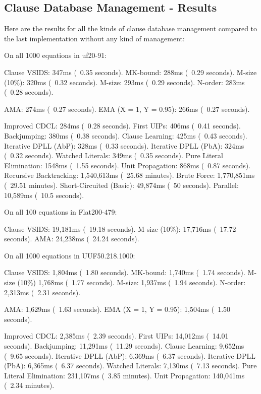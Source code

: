 \documentclass[../main.tex]{subfiles}
\begin{document}
\subsection{Clause Database Management - Results}

Here are the results for all the kinds of clause database management compared to 
the last implementation without any kind of management:

\begin{FVerbatim}
On all 1000 equations in uf20-91:

Clause VSIDS:               347ms (~0.35 seconds).
MK-bound:                   288ms (~0.29 seconds).
M-size (10\%):              320ms (~0.32 seconds).
M-size:                     293ms (~0.29 seconds).
N-order:                    283ms (~0.28 seconds).

AMA:                        274ms (~0.27 seconds).
EMA (X = 1, Y = 0.95):      266ms (~0.27 seconds).

Improved CDCL:              284ms (~0.28 seconds).
First UIPs:                 406ms (~0.41 seconds).
Backjumping:                380ms (~0.38 seconds).
Clause Learning:            425ms (~0.43 seconds).
Iterative DPLL (AbP):       328ms (~0.33 seconds).
Iterative DPLL (PbA):       324ms (~0.32 seconds).
Watched Literals:           349ms (~0.35 seconds).
Pure Literal Elimination:   1548ms (~1.55 seconds).
Unit Propagation:           868ms (~0.87 seconds).
Recursive Backtracking:     1,540,613ms (~25.68 minutes).
Brute Force:                1,770,851ms (~29.51 minutes).
Short-Circuited (Basic):    49,874ms (~50 seconds).
Parallel:                   10,589ms (~10.5 seconds).

On all 100 equations in Flat200-479:

Clause VSIDS:   19,181ms (~19.18 seconds).
M-size (10\%):  17,716ms (~17.72 seconds).
AMA:            24,238ms (~24.24 seconds).

On all 1000 equations in UUF50.218.1000:

Clause VSIDS:               1,804ms (~1.80 seconds).
MK-bound:                   1,740ms (~1.74 seconds).
M-size (10\%)               1,768ms (~1.77 seconds).
M-size:                     1,937ms (~1.94 seconds).
N-order:                    2,313ms (~2.31 seconds).

AMA:                        1,629ms (~1.63 seconds).
EMA (X = 1, Y = 0.95):      1,504ms (~1.50 seconds).

Improved CDCL:              2,385ms (~2.39 seconds).
First UIPs:                 14,012ms (~14.01 seconds).
Backjumping:                11,291ms (~11.29 seconds).
Clause Learning:            9,652ms (~9.65 seconds).
Iterative DPLL (AbP):       6,369ms (~6.37 seconds).
Iterative DPLL (PbA):       6,365ms (~6.37 seconds).
Watched Literals:           7,130ms (~7.13 seconds).
Pure Literal Elimination:   231,107ms (~3.85 minutes).
Unit Propagation:           140,041ms (~2.34 minutes).
\end{FVerbatim}
\noindent
\end{document}
